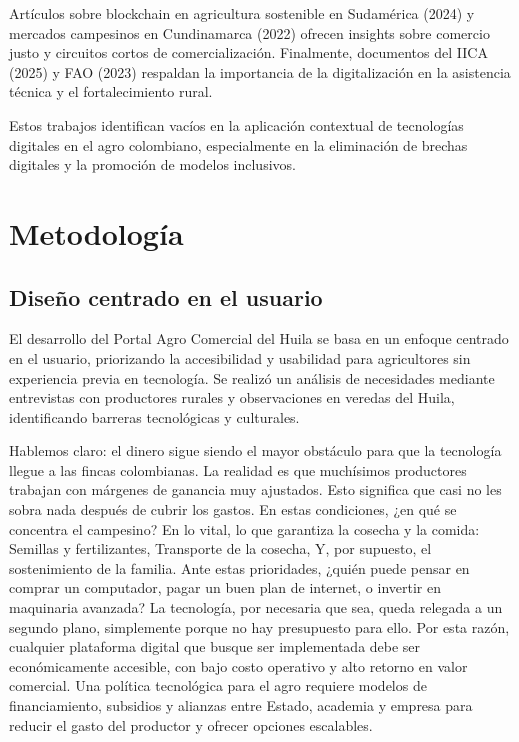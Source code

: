 Artículos sobre blockchain en agricultura sostenible en Sudamérica (2024) y mercados campesinos en Cundinamarca (2022) ofrecen insights sobre comercio justo y circuitos cortos de comercialización. Finalmente, documentos del IICA (2025) y FAO (2023) respaldan la importancia de la digitalización en la asistencia técnica y el fortalecimiento rural.

Estos trabajos identifican vacíos en la aplicación contextual de tecnologías digitales en el agro colombiano, especialmente en la eliminación de brechas digitales y la promoción de modelos inclusivos.

\section{Metodología}

\subsection{Diseño centrado en el usuario}
El desarrollo del Portal Agro Comercial del Huila se basa en un enfoque centrado en el usuario, priorizando la accesibilidad y usabilidad para agricultores sin experiencia previa en tecnología. Se realizó un análisis de necesidades mediante entrevistas con productores rurales y observaciones en veredas del Huila, identificando barreras tecnológicas y culturales.

Hablemos claro: el dinero sigue siendo el mayor obstáculo para que la tecnología llegue a las fincas colombianas. La realidad es que muchísimos productores trabajan con márgenes de ganancia muy ajustados. Esto significa que casi no les sobra nada después de cubrir los gastos. En estas condiciones, ¿en qué se concentra el campesino? En lo vital, lo que garantiza la cosecha y la comida: Semillas y fertilizantes, Transporte de la cosecha, Y, por supuesto, el sostenimiento de la familia. Ante estas prioridades, ¿quién puede pensar en comprar un computador, pagar un buen plan de internet, o invertir en maquinaria avanzada? La tecnología, por necesaria que sea, queda relegada a un segundo plano, simplemente porque no hay presupuesto para ello. Por esta razón, cualquier plataforma digital que busque ser implementada debe ser económicamente accesible, con bajo costo operativo y alto retorno en valor comercial. Una política tecnológica para el agro requiere modelos de financiamiento, subsidios y alianzas entre Estado, academia y empresa para reducir el gasto del productor y ofrecer opciones escalables.


